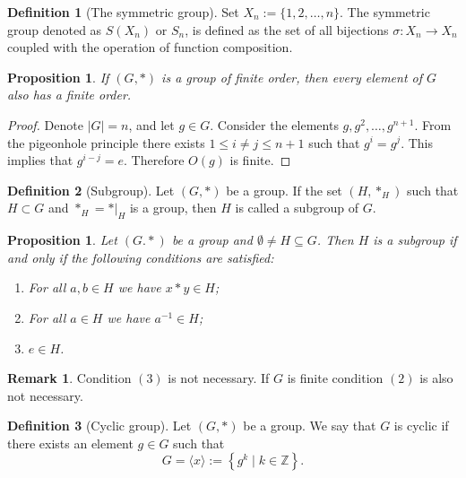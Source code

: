\documentclass[11pt,a4paper]{article}
\theoremstyle{definition}
\newtheorem{definition}{Definition}[section]
\newtheorem{remark}{Remark}[section]
\theoremstyle{plain}
\newtheorem{proposition}[theorem]{Proposition}
\newcommand{\Z}{\mathbb{Z}}
\newcommand{\set}[2]{ \left\{ #1 \mid #2 \right\} }
\begin{document}
  \begin{definition}[The symmetric group]
    Set $X_n := \{1,2,\dots,n\}$. 
	  The symmetric group denoted as $S(X_n)$ or $S_n$, is defined as the set 
    of all bijections $\sigma \colon X_n \to X_n$ coupled with the operation 
    of function composition.
  \end{definition}

  \begin{proposition}
    If $(G, *)$ is a group of finite order, then every element of $G$ also has
    a finite order.
  \end{proposition}
  \begin{proof}
    Denote $|G|=n$, and let $g \in G$.
    Consider the elements $g, g^2, \dots, g^{n+1}$.
    From the pigeonhole principle there exists $1 \le i \neq j \le n+1$
    such that $g^i = g^j$. This implies that $g^{i-j} = e$.
  	Therefore $O(g)$ is finite.
  \end{proof}

  \begin{definition}[Subgroup]
    Let $(G, *)$ be a group. If the set $(H,*_H)$ such that $H \subset G$
    and $*_H = *\vert_H$ is a group, then $H$ is called a subgroup of $G$.
  \end{definition}

  \begin{proposition}
    Let $(G.*)$ be a group and $\emptyset \neq H \subseteq G$.
    Then $H$ is a subgroup if and only if the following conditions are
    satisfied:
    \begin{enumerate}
      \item[(1)] For all $a,b \in H$ we have $x * y \in H$;
      \item[(2)] For all $a \in H$ we have $a^{-1} \in H$;
      \item[(3)] $e \in H$.
    \end{enumerate}
  \end{proposition}
  \begin{remark}
    Condition $(3)$ is not necessary.
    If $G$ is finite condition $(2)$ is also not necessary.
  \end{remark}

  \begin{definition}[Cyclic group]
    Let $(G,*)$ be a group. We say that $G$ is cyclic if there exists
    an element $g \in G$ such that
    \[
      G = \langle x \rangle := \set{g^k}{k \in \Z}.
    \]
  \end{definition}
\end{document}
